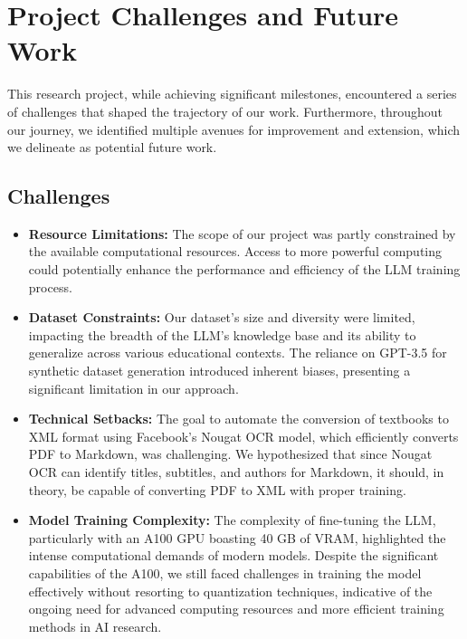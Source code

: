 \documentclass[]{article}
\begin{document}
\section{Project Challenges and Future Work}

This research project, while achieving significant milestones, encountered a series of challenges that shaped the trajectory of our work. Furthermore, throughout our journey, we identified multiple avenues for improvement and extension, which we delineate as potential future work.

\subsection{Challenges}
\begin{itemize}
    \item \textbf{Resource Limitations:} The scope of our project was partly constrained by the available computational resources. Access to more powerful computing could potentially enhance the performance and efficiency of the LLM training process.
    
    \item \textbf{Dataset Constraints:} Our dataset's size and diversity were limited, impacting the breadth of the LLM's knowledge base and its ability to generalize across various educational contexts. The reliance on GPT-3.5 for synthetic dataset generation introduced inherent biases, presenting a significant limitation in our approach.
    
    \item \textbf{Technical Setbacks:} The goal to automate the conversion of textbooks to XML format using Facebook's Nougat OCR model, which efficiently converts PDF to Markdown, was challenging. We hypothesized that since Nougat OCR can identify titles, subtitles, and authors for Markdown, it should, in theory, be capable of converting PDF to XML with proper training.
    
    \item \textbf{Model Training Complexity:} The complexity of fine-tuning the LLM, particularly with an A100 GPU boasting 40 GB of VRAM, highlighted the intense computational demands of modern models. Despite the significant capabilities of the A100, we still faced challenges in training the model effectively without resorting to quantization techniques, indicative of the ongoing need for advanced computing resources and more efficient training methods in AI research.
\end{itemize}
\end{document}
